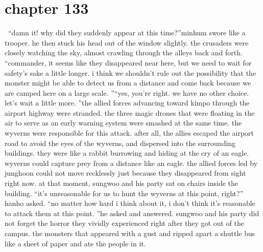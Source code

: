 \section{chapter 133}






 “damn it! why did they suddenly appear at this time?”minhum swore like a trooper.
 he then stuck his head out of the window slightly.
the crusaders were closely watching the sky, almost crawling through the alleys back and forth.
“commander, it seems like they disappeared near here, but we need to wait for safety’s sake a little longer.
 i think we shouldn’t rule out the possibility that the monster might be able to detect us from a distance and come back because we are camped here on a large scale.
”“yes, you’re right.
 we have no other choice.
 let’s wait a little more.
”the allied forces advancing toward kimpo through the airport highway were stranded.
 the three magic drones that were floating in the air to serve as an early warning system were smashed at the same time.
 the wyverns were responsible for this attack.
after all, the allies escaped the airport road to avoid the eyes of the wyverns, and dispersed into the surrounding buildings.
 they were like a rabbit burrowing and hiding at the cry of an eagle.
wyverns could capture prey from a distance like an eagle.
 the allied forces led by junghoon could not move recklessly just because they disappeared from sight right now.
at that moment, sungwoo and his party sat on chairs inside the building.
“it’s unreasonable for us to hunt the wyverns at this point, right?” hanho asked.
 “no matter how hard i think about it, i don’t think it’s reasonable to attack them at this point.
”he asked and answered.
sungwoo and his party did not forget the horror they vividly experienced right after they got out of the campus.
the monsters that appeared with a gust and ripped apart a shuttle bus like a sheet of paper and ate the people in it.

